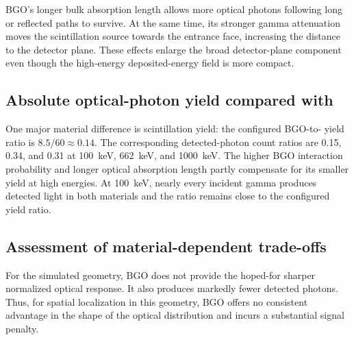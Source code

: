 BGO's longer bulk absorption length allows more optical photons following long or reflected paths to survive. At the same time, its stronger gamma attenuation moves the scintillation source towards the entrance face, increasing the distance to the detector plane. These effects enlarge the broad detector-plane component even though the high-energy deposited-energy field is more compact.

\subsection{Absolute optical-photon yield compared with }

One major material difference is scintillation yield: the configured BGO-to- yield ratio is $8.5/60\approx 0.14$. The corresponding detected-photon count ratios are 0.15, 0.34, and 0.31 at \qty{100}{\kilo\electronvolt}, \qty{662}{\kilo\electronvolt}, and \qty{1000}{\kilo\electronvolt}. The higher BGO interaction probability and longer optical absorption length partly compensate for its smaller yield at high energies. At \qty{100}{\kilo\electronvolt}, nearly every incident gamma produces detected light in both materials and the ratio remains close to the configured yield ratio.

\subsection{Assessment of material-dependent trade-offs}

For the simulated  geometry, BGO does not provide the hoped-for sharper normalized optical response. It also produces markedly fewer detected photons. Thus, for spatial localization in this geometry, BGO offers no consistent advantage in the shape of the optical distribution and incurs a substantial signal penalty.

\FloatBarrier
